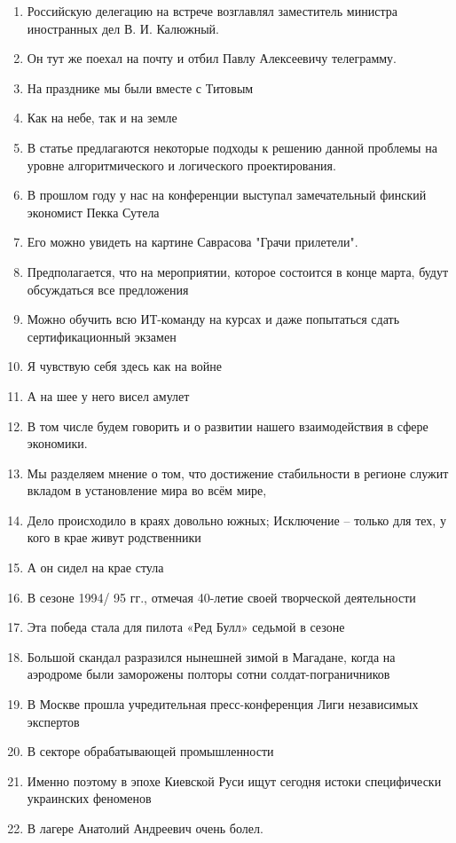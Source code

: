 \documentclass[paper=a4, fontsize=11pt]{scrartcl}
\begin{document}
\begin{enumerate}
    \item Российскую делегацию на встрече возглавлял заместитель министра иностранных дел В. И. Калюжный.
    \item Он тут же поехал на почту и отбил Павлу Алексеевичу телеграмму.
    \item На празднике мы были вместе с Титовым
    \item Как на небе, так и на земле
    \item В статье предлагаются некоторые подходы к решению данной проблемы на уровне алгоритмического и логического проектирования. 
    \item В прошлом году у нас на конференции выступал замечательный финский экономист Пекка Сутела
    \item Его можно увидеть на картине Саврасова "Грачи прилетели".
    \item Предполагается, что на мероприятии, которое состоится в конце марта, будут обсуждаться все предложения
    \item Можно обучить всю ИТ-команду на курсах и даже попытаться сдать сертификационный экзамен
    \item Я чувствую себя здесь как на войне
    \item А на шее у него висел амулет
    \item В том числе будем говорить и о развитии нашего взаимодействия в сфере экономики.
    \item Мы разделяем мнение о том, что достижение стабильности в регионе служит вкладом в установление мира во всём мире,
    \item Дело происходило в краях довольно южных; Исключение -- только для тех, у кого в крае живут родственники
    \item А он сидел на крае стула
    \item В сезоне 1994/ 95 гг., отмечая 40-летие своей творческой деятельности
    \item Эта победа стала для пилота «Ред Булл» седьмой в сезоне
    \item Большой скандал разразился нынешней зимой в Магадане, когда на аэродроме были заморожены полторы сотни солдат-пограничников
    \item В Москве прошла учредительная пресс-конференция Лиги независимых экспертов
    \item В секторе обрабатывающей промышленности
    \item Именно поэтому в эпохе Киевской Руси ищут сегодня истоки специфически украинских феноменов
    \item В лагере Анатолий Андреевич очень болел.
\end{enumerate}
\end{document}
